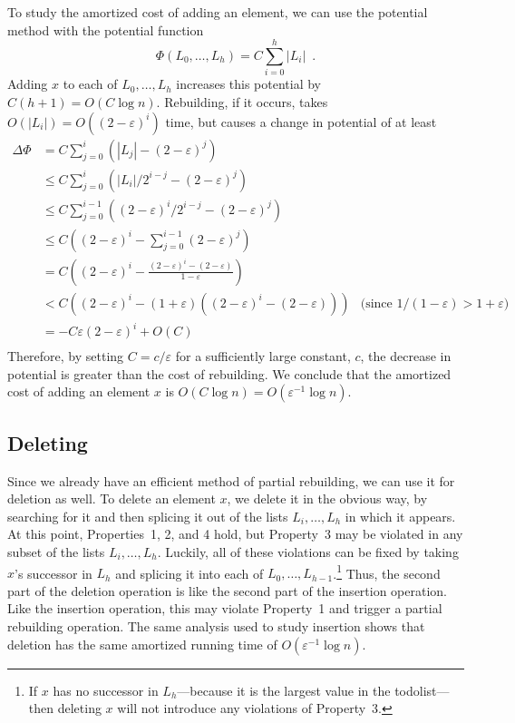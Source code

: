 \documentclass{patmorin}
\newcommand{\eps}{\varepsilon}
\begin{document}
To study the amortized cost of adding an element, we
can use the potential method with the potential function
\[
    \Phi(L_0,\ldots,L_h)=C\sum_{i=0}^h|L_i| \enspace .
\]
Adding $x$ to each of $L_0,\ldots,L_h$ increases this potential by
$C(h+1)=O(C\log n)$.  Rebuilding, if it occurs, takes $O(|L_i|)=O((2-\eps)^i)$
time, but causes a change in potential of at least
\begin{align*}
     \Delta\Phi & = C\sum_{j=0}^i\left(|L_j| - (2-\eps)^j\right) \\
     	& \le C\sum_{j=0}^i\left(|L_i|/2^{i-j} - (2-\eps)^j\right) \\ 
          & \le C\sum_{j=0}^{i-1}\left((2-\eps)^i/2^{i-j} - (2-\eps)^j\right) \\
          & \le C\left((2-\eps)^i - \sum_{j=0}^{i-1}(2-\eps)^j\right) \\
          & = C\left((2-\eps)^i - \frac{(2-\eps)^i-(2-\eps)}{1-\eps}\right) \\
          & < C\left((2-\eps)^i - (1+\eps)\left((2-\eps)^i-(2-\eps)\right)\right)
           & \text{(since $1/(1-\eps)>1+\eps$)} \\
          & = -C\eps(2-\eps)^i + O(C) \\
\end{align*}
Therefore, by setting $C=c/\eps$ for a sufficiently large constant,
$c$, the decrease in potential is greater than the cost of rebuilding.
We conclude that the amortized cost of adding an element $x$ is $O(C\log
n)=O(\eps^{-1}\log n)$.

\subsection{Deleting}

Since we already have an efficient method of partial rebuilding, we
can use it for deletion as well. To delete an element $x$, we delete
it in the obvious way, by searching for it and then splicing it out
of the lists $L_i,\ldots,L_h$ in which it appears.  At this point,
Properties~1, 2, and 4 hold, but Property~3 may be violated in any
subset of the lists $L_i,\ldots,L_h$.  Luckily, all of these violations
can be fixed by taking $x$'s successor in $L_h$ and splicing it into
each of $L_0,\ldots,L_{h-1}$.\footnote{If $x$ has no successor in
$L_h$---because it is the largest value in the todolist---then deleting
$x$ will not introduce any violations of Property~3.}  Thus, the second
part of the deletion operation is like the second part of the insertion
operation.  Like the insertion operation, this may violate Property~1
and trigger a partial rebuilding operation.  The same analysis used to
study insertion shows that deletion has the same amortized running time
of $O(\eps^{-1}\log n)$.
\end{document}
